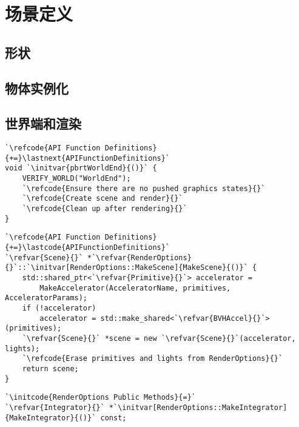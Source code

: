 \section{场景定义}\label{sec:场景定义}

\subsection{形状}\label{sub:形状}
{}

\subsection{物体实例化}\label{sub:物体实例化}

\subsection{世界端和渲染}\label{sub:世界端和渲染}
\begin{lstlisting}
`\refcode{API Function Definitions}{+=}\lastnext{APIFunctionDefinitions}`
void `\initvar{pbrtWorldEnd}{()}` {
    VERIFY_WORLD("WorldEnd");
    `\refcode{Ensure there are no pushed graphics states}{}`
    `\refcode{Create scene and render}{}`
    `\refcode{Clean up after rendering}{}`
}
\end{lstlisting}

\begin{lstlisting}
`\refcode{API Function Definitions}{+=}\lastcode{APIFunctionDefinitions}`
`\refvar{Scene}{}` *`\refvar{RenderOptions}{}`::`\initvar[RenderOptions::MakeScene]{MakeScene}{()}` {
    std::shared_ptr<`\refvar{Primitive}{}`> accelerator =
        MakeAccelerator(AcceleratorName, primitives, AcceleratorParams);
    if (!accelerator)
        accelerator = std::make_shared<`\refvar{BVHAccel}{}`>(primitives);
    `\refvar{Scene}{}` *scene = new `\refvar{Scene}{}`(accelerator, lights);
    `\refcode{Erase primitives and lights from RenderOptions}{}`
    return scene;
}
\end{lstlisting}

\begin{lstlisting}
`\initcode{RenderOptions Public Methods}{=}` 
`\refvar{Integrator}{}` *`\initvar[RenderOptions::MakeIntegrator]{MakeIntegrator}{()}` const;
\end{lstlisting}